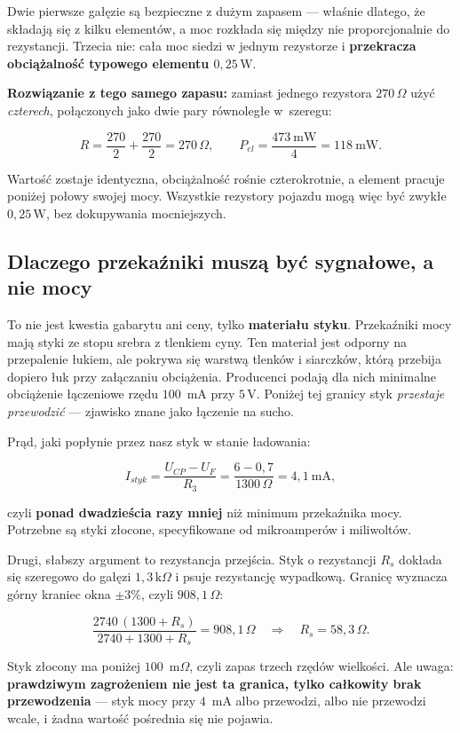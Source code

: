 \documentclass[a4paper,11pt]{article}
\newcommand{\ohm}{\,\Omega}
\newcommand{\kohm}{\,\mathrm{k}\Omega}
\newcommand{\volt}{\,\mathrm{V}}
\newcommand{\watt}{\,\mathrm{W}}
\begin{document}
Dwie pierwsze gałęzie są bezpieczne z dużym zapasem --- właśnie dlatego, że składają
się z kilku elementów, a moc rozkłada się między nie proporcjonalnie do rezystancji.
Trzecia nie: cała moc siedzi w jednym rezystorze i \textbf{przekracza obciążalność
typowego elementu $0{,}25\watt$}.

\textbf{Rozwiązanie z tego samego zapasu:} zamiast jednego rezystora $270\ohm$ użyć
\emph{czterech}, połączonych jako dwie pary równoległe w~szeregu:

\[
R=\frac{270}{2}+\frac{270}{2}=270\ohm ,
\qquad
P_{el}=\frac{473\ \mathrm{mW}}{4}=118\ \mathrm{mW}.
\]

Wartość zostaje identyczna, obciążalność rośnie czterokrotnie, a element pracuje
poniżej połowy swojej mocy. Wszystkie rezystory pojazdu mogą więc być zwykłe
$0{,}25\watt$, bez dokupywania mocniejszych.

\subsection{Dlaczego przekaźniki muszą być sygnałowe, a nie mocy}
\label{sec:przekazniki}

To nie jest kwestia gabarytu ani ceny, tylko \textbf{materiału styku}. Przekaźniki
mocy mają styki ze stopu srebra z tlenkiem cyny. Ten materiał jest odporny na
przepalenie łukiem, ale pokrywa się warstwą tlenków i siarczków, którą przebija
dopiero łuk przy załączaniu obciążenia. Producenci podają dla nich minimalne
obciążenie łączeniowe rzędu $100$~mA przy $5\volt$. Poniżej tej granicy styk
\emph{przestaje przewodzić} --- zjawisko znane jako łączenie na sucho.

Prąd, jaki popłynie przez nasz styk w stanie ładowania:

\[
I_{styk}=\frac{U_{CP}-U_{F}}{R_3}=\frac{6-0{,}7}{1300\ohm}=4{,}1\ \mathrm{mA},
\]

czyli \textbf{ponad dwadzieścia razy mniej} niż minimum przekaźnika mocy. Potrzebne
są styki złocone, specyfikowane od mikroamperów i miliwoltów.

Drugi, słabszy argument to rezystancja przejścia. Styk o rezystancji $R_s$ dokłada
się szeregowo do gałęzi $1{,}3\kohm$ i psuje rezystancję wypadkową. Granicę
wyznacza górny kraniec okna $\pm3\%$, czyli $908{,}1\ohm$:

\[
\frac{2740\,(1300+R_s)}{2740+1300+R_s}=908{,}1\ohm
\quad\Longrightarrow\quad
R_s = 58{,}3\ohm .
\]

Styk złocony ma poniżej $100$~m$\Omega$, czyli zapas trzech rzędów wielkości. Ale
uwaga: \textbf{prawdziwym zagrożeniem nie jest ta granica, tylko całkowity brak
przewodzenia} --- styk mocy przy $4$~mA albo przewodzi, albo nie przewodzi wcale,
i żadna wartość pośrednia się nie pojawia.
\end{document}
